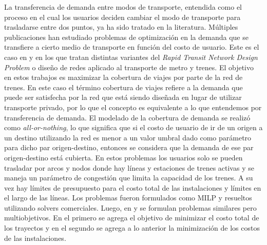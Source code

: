 \documentclass{article}
\begin{document}

  La transferencia de demanda entre modos de transporte, entendida como el proceso en el cual los usuarios deciden cambiar el modo de transporte para trasladarse entre dos puntos, ya ha sido tratado en la literatura. Múltiples publicaciones han estudiado problemas de optimización en la demanda que se transfiere a cierto medio de transporte en función del costo de usuario. Este es el caso en \cite{garcia2005} y \cite{laporte2007} en los que tratan distintas variantes del {\it Rapid Transit Network Design Problem} o diseño de redes aplicado al transporte de metro y trenes. El objetivo en estos trabajos es maximizar la cobertura de viajes por parte de la red de trenes. En este caso el término cobertura de viajes refiere a la demanda que puede ser satisfecha por la red que está siendo diseñada en lugar de utilizar transporte privado, por lo que el concepto es equivalente a lo que entendemos por transferencia de demanda. El modelado de la cobertura de demanda se realizó como {\it all-or-nothing}, lo que significa que si el costo de usuario de ir de un origen a un destino utilizando la red es menor a un valor umbral dado como parámetro para dicho par origen-destino, entonces se considera que la demanda de ese par origen-destino está cubierta. En estos problemas los usuarios solo se pueden trasladar por arcos y nodos donde hay líneas y estaciones de trenes activas y se maneja un parámetro de congestión que limita la capacidad de los trenes. A su vez hay límites de presupuesto para el costo total de las instalaciones y límites en el largo de las líneas. Los problemas fueron formulados como MILP y resueltos utilizando solvers comerciales. Luego, en \cite{marin2007} y \cite{cadarso2015} se formulan problemas similares pero multiobjetivos. En el primero se agrega el objetivo de minimizar el costo total de los trayectos y en el segundo se agrega a lo anterior la minimización de los costos de las instalaciones.
\end{document}
